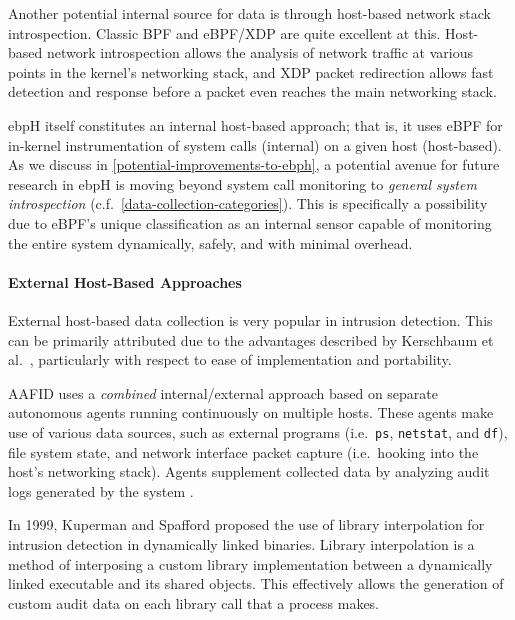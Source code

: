 \documentclass[
  12pt]{findlay}
\begin{document}
Another potential internal source for data is through host-based network
stack introspection. Classic BPF \autocite{bpf} and eBPF/XDP
\autocite{starovoitov13,starovoitov14,bcc,xdp} are quite excellent at
this. Host-based network introspection allows the analysis of network
traffic at various points in the kernel's networking stack, and XDP
packet redirection \autocite{xdp} allows fast detection and response
before a packet even reaches the main networking stack.

ebpH itself constitutes an internal host-based approach; that is, it
uses eBPF for in-kernel instrumentation of system calls (internal) on a
given host (host-based). As we discuss in
\autoref{potential-improvements-to-ebph}, a potential avenue for future
research in ebpH is moving beyond system call monitoring to
\emph{general system introspection}
(c.f.~\autoref{data-collection-categories}). This is specifically a
possibility due to eBPF's unique classification as an internal sensor
capable of monitoring the entire system dynamically, safely, and with
minimal overhead.

\hypertarget{external-host-based-approaches}{%
\paragraph{External Host-Based
Approaches}\label{external-host-based-approaches}}

External host-based data collection is very popular in intrusion
detection. This can be primarily attributed due to the advantages
described by Kerschbaum et al.~\autocite{spafford02}, particularly with
respect to ease of implementation and portability.

AAFID \autocite{spafford00} uses a \emph{combined} internal/external
approach based on separate autonomous agents running continuously on
multiple hosts. These agents make use of various data sources, such as
external programs (i.e.~\passthrough{\lstinline!ps!},
\passthrough{\lstinline!netstat!}, and \passthrough{\lstinline!df!}),
file system state, and network interface packet capture (i.e.~hooking
into the host's networking stack). Agents supplement collected data by
analyzing audit logs generated by the system \autocite{spafford02}.

In 1999, Kuperman and Spafford \autocite{kuperman99} proposed the use of
library interpolation for intrusion detection in dynamically linked
binaries. Library interpolation is a method of interposing a custom
library implementation between a dynamically linked executable and its
shared objects. This effectively allows the generation of custom audit
data on each library call that a process makes.
\end{document}
